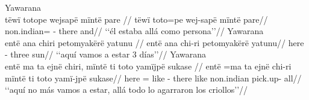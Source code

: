 \documentclass{memoir}
\begin{document}
        \endgl 
    \a Yawarana\\
    \label{ctorosq-17}        \begingl
        \glpreamble tëwï totope wejsapë mïntë pare //
        \gla tëwï toto=pe wej-sapë mïntë pare//
        \glb {} non.indian= - there and//
            \glft ‘‘él estaba allá como persona’’//  
        \endgl 
    \a Yawarana\\
    \label{ctovarmafl-40}        \begingl
        \glpreamble entë ana chiri petomyakërë yatunu //
        \gla entë ana chi-ri petomyakërë yatunu//
        \glb here  - three sun//
            \glft ‘‘aquí vamos a estar 3 días’’//  
        \endgl 
    \a Yawarana\\
    \label{histyarirdi-674}        \begingl
        \glpreamble entë ma ta ejnë chiri, mïntë ti toto yamïjpë sukase //
        \gla entë =ma ta ejnë chi-ri mïntë ti toto yamï-jpë sukase//
        \glb here = like  - there like non.indian pick.up- all//
            \glft ‘‘aquí no más vamos a estar, allá todo lo agarraron los criollos’’//  
        \endgl 
\xe
\end{document}
